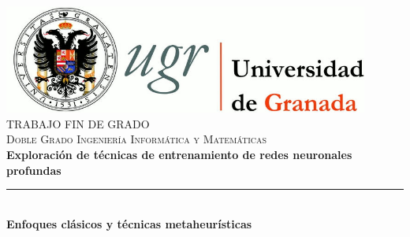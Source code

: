 \begin{titlepage}
 
 
\newlength{\centeroffset}
\setlength{\centeroffset}{-0.5\oddsidemargin}
\addtolength{\centeroffset}{0.5\evensidemargin}
\thispagestyle{empty}

\noindent\hspace*{\centeroffset}\begin{minipage}{\textwidth}

\centering
\includegraphics[width=0.9\textwidth]{Plantilla_TFG_latex/imagenes/logo_ugr.jpg}\\[1.4cm]

\textsc{ \Large TRABAJO FIN DE GRADO\\[0.2cm]}
\textsc{ Doble Grado Ingeniería Informática y Matemáticas}\\[1cm]
% 
{\Huge\bfseries Exploración de técnicas de entrenamiento de redes neuronales profundas\\
}
\noindent\rule[-1ex]{\textwidth}{3pt}\\[3.5ex]
{\large\bfseries Enfoques clásicos y técnicas metaheurísticas}
\end{minipage}

\vspace{1cm}
\noindent\hspace*{\centeroffset}\begin{minipage}{\textwidth}
\centering


\end{minipage}
\end{titlepage}
